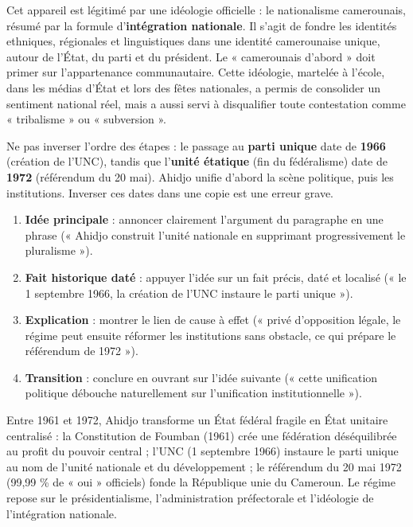 \documentclass[11pt]{article}
\newcommand{\cle}[1]{{\popxbold\color{popdark}#1}}
\begin{document}
Cet appareil est légitimé par une idéologie officielle : le \cle{nationalisme camerounais}, résumé par la formule d'\textbf{intégration nationale}. Il s'agit de fondre les identités ethniques, régionales et linguistiques dans une identité camerounaise unique, autour de l'État, du parti et du président. Le « camerounais d'abord » doit primer sur l'appartenance communautaire. Cette idéologie, martelée à l'école, dans les médias d'État et lors des fêtes nationales, a permis de consolider un sentiment national réel, mais a aussi servi à disqualifier toute contestation comme « tribalisme » ou « subversion ».

\begin{attention}
Ne pas inverser l'ordre des étapes : le passage au \textbf{parti unique} date de \textbf{1966} (création de l'UNC), tandis que l'\textbf{unité étatique} (fin du fédéralisme) date de \textbf{1972} (référendum du 20 mai). Ahidjo unifie d'abord la scène politique, puis les institutions. Inverser ces dates dans une copie est une erreur grave.
\end{attention}

\begin{methode}
\begin{enumerate}
\item \textbf{Idée principale} : annoncer clairement l'argument du paragraphe en une phrase (« Ahidjo construit l'unité nationale en supprimant progressivement le pluralisme »).
\item \textbf{Fait historique daté} : appuyer l'idée sur un fait précis, daté et localisé (« le 1\ier{} septembre 1966, la création de l'UNC instaure le parti unique »).
\item \textbf{Explication} : montrer le lien de cause à effet (« privé d'opposition légale, le régime peut ensuite réformer les institutions sans obstacle, ce qui prépare le référendum de 1972 »).
\item \textbf{Transition} : conclure en ouvrant sur l'idée suivante (« cette unification politique débouche naturellement sur l'unification institutionnelle »).
\end{enumerate}
\end{methode}

\begin{aretenir}[L'essentiel]
Entre 1961 et 1972, Ahidjo transforme un État fédéral fragile en État unitaire centralisé : la Constitution de Foumban (1961) crée une fédération déséquilibrée au profit du pouvoir central ; l'UNC (1\ier{} septembre 1966) instaure le parti unique au nom de l'unité nationale et du développement ; le référendum du 20 mai 1972 (99,99 \% de « oui » officiels) fonde la République unie du Cameroun. Le régime repose sur le présidentialisme, l'administration préfectorale et l'idéologie de l'intégration nationale.
\end{aretenir}
\end{document}

